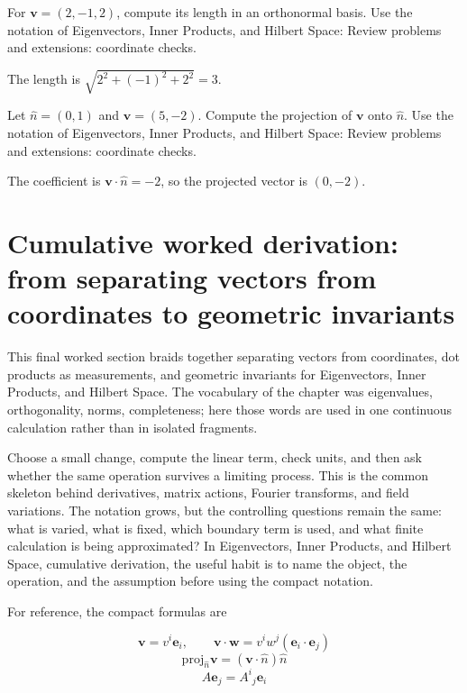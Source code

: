 \begin{exercise}
For \(\bm v=(2,-1,2)\), compute its length in an orthonormal basis.  Use the notation of Eigenvectors, Inner Products, and Hilbert Space: Review problems and extensions: coordinate checks.
\begin{answer}
The length is \(\sqrt{2^2+(-1)^2+2^2}=3\).
\end{answer}
\end{exercise}

\begin{exercise}
Let \(\hat n=(0,1)\) and \(\bm v=(5,-2)\).  Compute the projection of \(\bm v\) onto \(\hat n\).  Use the notation of Eigenvectors, Inner Products, and Hilbert Space: Review problems and extensions: coordinate checks.
\begin{answer}
The coefficient is \(\bm v\cdot\hat n=-2\), so the projected vector is \((0,-2)\).
\end{answer}
\end{exercise}



\section{Cumulative worked derivation: from separating vectors from coordinates to geometric invariants}

This final worked section braids together separating vectors from coordinates, dot products as measurements, and geometric invariants for Eigenvectors, Inner Products, and Hilbert Space.  The vocabulary of the chapter was eigenvalues, orthogonality, norms, completeness; here those words are used in one continuous calculation rather than in isolated fragments.

Choose a small change, compute the linear term, check units, and then ask whether the same operation survives a limiting process.  This is the common skeleton behind derivatives, matrix actions, Fourier transforms, and field variations.  The notation grows, but the controlling questions remain the same: what is varied, what is fixed, which boundary term is used, and what finite calculation is being approximated?  In Eigenvectors, Inner Products, and Hilbert Space, cumulative derivation, the useful habit is to name the object, the operation, and the assumption before using the compact notation.

For reference, the compact formulas are

\[
  \bm v=v^i\bm e_i,\qquad \bm v\cdot\bm w=v^iw^j(\bm e_i\cdot\bm e_j)
\]
\[
  \mathrm{proj}_{\hat n}\bm v=(\bm v\cdot\hat n)\hat n
\]
\[
  A\bm e_j=A^i{}_j\bm e_i
\]

